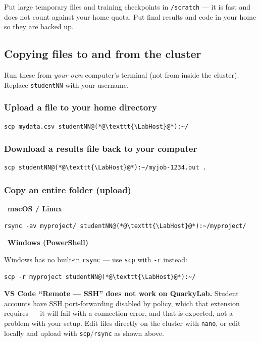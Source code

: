 \documentclass[11pt]{article}
\newcommand{\LabName}{QuarkyLab}                       %
\newcommand{\LabHost}{quarkylab}                       %
\newcommand{\code}[1]{\texttt{#1}}
\newcommand{\osbadge}[1]{\vspace{0.4ex}\noindent{\color{quarkA}\rule{2pt}{10pt}}\ \textbf{\color{quarkA}#1}\par\nopagebreak\vspace{0.3ex}}
\begin{document}
\begin{tipbox}
Put large temporary files and training checkpoints in \code{/scratch} --- it is fast and does not count against your home quota. Put final results and code in your home so they are backed up.
\end{tipbox}

\subsection{Copying files to and from the cluster}
Run these from \emph{your own} computer's terminal (not from inside the cluster). Replace \code{studentNN} with your username.

\subsubsection*{Upload a file to your home directory}
\begin{lstlisting}
scp mydata.csv studentNN@(*@\texttt{\LabHost}@*):~/
\end{lstlisting}

\subsubsection*{Download a results file back to your computer}
\begin{lstlisting}
scp studentNN@(*@\texttt{\LabHost}@*):~/myjob-1234.out .
\end{lstlisting}

\subsubsection*{Copy an entire folder (upload)}
\osbadge{macOS / Linux}
\begin{lstlisting}
rsync -av myproject/ studentNN@(*@\texttt{\LabHost}@*):~/myproject/
\end{lstlisting}
\osbadge{Windows (PowerShell)}
Windows has no built-in \code{rsync} --- use \code{scp} with \code{-r} instead:
\begin{lstlisting}
scp -r myproject studentNN@(*@\texttt{\LabHost}@*):~/
\end{lstlisting}

\begin{warnbox}
\textbf{VS Code ``Remote --- SSH'' does not work on \LabName.} Student accounts have SSH port-forwarding disabled by policy, which that extension requires --- it will fail with a connection error, and that is expected, not a problem with your setup. Edit files directly on the cluster with \code{nano}, or edit locally and upload with \code{scp}/\code{rsync} as shown above.
\end{warnbox}
\end{document}
